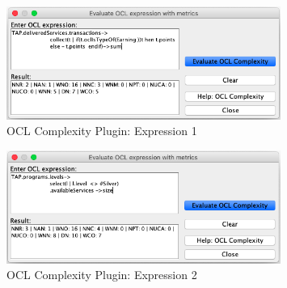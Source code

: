 \begin{figure}[ht]
    \centering
    \includegraphics[width=0.8\textwidth]{Chapters/figures/5_Implementation/02_Expression_1}
    \caption{OCL Complexity Plugin: Expression 1}
    \label{fig:02_expression_1}
\end{figure}

\begin{figure}[ht]
    \centering
    \includegraphics[width=0.8\textwidth]{Chapters/figures/5_Implementation/02_Expression_2}
    \caption{OCL Complexity Plugin: Expression 2}
    \label{fig:02_expression_2}
\end{figure}

